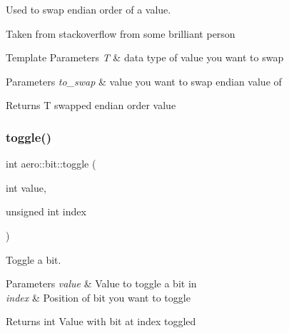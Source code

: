 Used to swap endian order of a value. 

Taken from stackoverflow from some brilliant person


\begin{DoxyTemplParams}{Template Parameters}
{\em T} & data type of value you want to swap \\
\hline
\end{DoxyTemplParams}

\begin{DoxyParams}{Parameters}
{\em to\+\_\+swap} & value you want to swap endian value of \\
\hline
\end{DoxyParams}
\begin{DoxyReturn}{Returns}
T swapped endian order value 
\end{DoxyReturn}
\mbox{\label{namespaceaero_1_1bit_aa4ee1ec3b1b61413fb2c4bc0a12ba106}} 
\subsubsection{\texorpdfstring{toggle()}{toggle()}}
{\footnotesize\ttfamily int aero\+::bit\+::toggle (\begin{DoxyParamCaption}\item[{int}]{value,  }\item[{unsigned int}]{index }\end{DoxyParamCaption})}



Toggle a bit. 


\begin{DoxyParams}{Parameters}
{\em value} & Value to toggle a bit in \\
\hline
{\em index} & Position of bit you want to toggle \\
\hline
\end{DoxyParams}
\begin{DoxyReturn}{Returns}
int Value with bit at index toggled 
\end{DoxyReturn}
